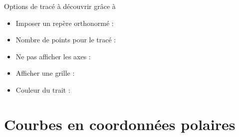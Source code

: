 \begin{frame}[fragile]
Options de tracé à découvrir grâce 
à  

\pause
\begin{itemize}
  \item Imposer un repère orthonormé : 
\pause
  \item Nombre de points pour le tracé : 
\pause    
  \item Ne pas afficher les axes : 
\pause  
  \item Afficher une grille : 
\pause  
  \item Couleur du trait : 

\end{itemize}
\end{frame}




\section{Courbes en coordonnées polaires}

